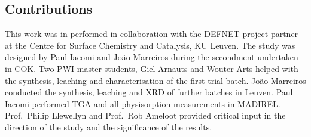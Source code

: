 \subsection*{Contributions}

This work was in performed in collaboration with the DEFNET project partner
at the Centre for Surface Chemistry and Catalysis, KU Leuven. 
The study was designed by Paul Iacomi and João Marreiros during 
the secondment undertaken in COK.
Two PWI master students, Giel Arnauts and Wouter Arts helped with
the synthesis, leaching and characterisation of the first trial batch.
João Marreiros conducted the synthesis, leaching and \gls{XRD}
of further batches in Leuven. Paul Iacomi performed \gls{TGA} 
and all physisorption measurements in MADIREL.
Prof.\ Philip Llewellyn and Prof.\ Rob Ameloot provided critical
input in the direction of the study and the significance of the 
results.